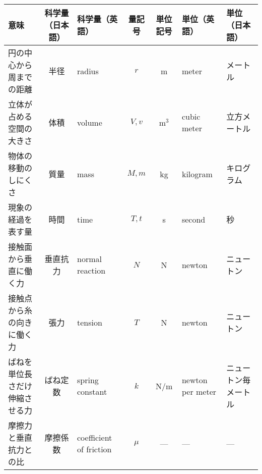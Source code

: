 \documentclass[b5j, landscape]{jarticle}
\begin{document}
\vfill
\begin{tabular}{|l|c|l|c|c|l|l|}\hline
\hfil 意味	&科学量（日本語）				&\hfil 科学量（英語）				&量記号				&単位記号		&\hfil 単位（英語）					&\hfil 単位（日本語）\\ \hline
円の中心から周までの距離	&半径				&radius					&$r$				&m		&meter						&メートル \\ \hline
立体が占める空間の大きさ	&体積				&volume					&$V, v$				&m$^3$	&cubic meter				&立方メートル \\ \hline
物体の移動のしにくさ	&質量				&mass					&$M, m$				&kg		&kilogram					&キログラム \\ \hline
現象の経過を表す量	&時間				&time					&$T, t$				&s		&second						&秒 \\ \hline
接触面から垂直に働く力					&垂直抗力		&normal reaction			&$N$		&N		&newton	&ニュートン \\ \hline
接触点から糸の向きに働く力	&張力				&tension 		&$T$			&N		&newton						&ニュートン \\ \hline
ばねを単位長さだけ伸縮させる力	&ばね定数				&spring constant		&$k$			&N/m		&newton per meter						&ニュートン毎メートル \\ \hline
摩擦力と垂直抗力との比					&摩擦係数		&coefficient of friction	&$\mu$		&---		&---	&---	\\ \hline
\end{tabular}
\end{document}
